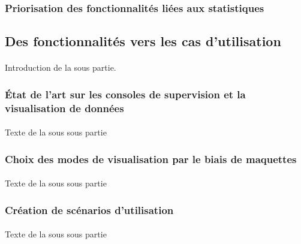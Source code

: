 			\paragraph{}%
			
		\subsubsection{Priorisation des fonctionnalités liées aux statistiques}
			\paragraph{}%
	
	\subsection{Des fonctionnalités vers les cas d'utilisation}
		\paragraph{}
		Introduction de la sous partie.
		
		\subsubsection{État de l'art sur les consoles de supervision et la visualisation de données}
			\paragraph{}
			Texte de la sous sous partie
		\subsubsection{Choix des modes de visualisation par le biais de maquettes}
			\paragraph{}
			Texte de la sous sous partie
		\subsubsection{Création de scénarios d'utilisation}
			\paragraph{}
			Texte de la sous sous partie
